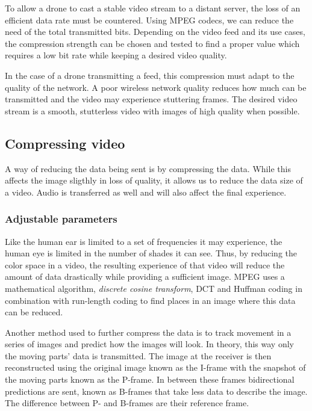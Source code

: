 To allow a drone to cast a stable video stream to a distant server, the loss of an efficient data rate must be countered. Using MPEG codecs, we can reduce the need of the total transmitted bits. Depending on the video feed and its use cases, the compression strength can be chosen and tested to find a proper value which requires a low bit rate while keeping a desired video quality.

In the case of a drone transmitting a feed, this compression must adapt to the quality of the network. A poor wireless network quality reduces how much can be transmitted and the video may experience stuttering frames. The desired video stream is a smooth, stutterless video with images of high quality when possible. 

\subsection{Compressing video}
A way of reducing the data being sent is by compressing the data. While this affects the image sligthly in loss of quality, it allows us to reduce the data size of a video. Audio is transferred as well and will also affect the final experience.

\subsubsection{Adjustable parameters}
Like the human ear is limited to a set of frequencies it may experience, the human eye is limited in the number of shades it can see. Thus, by reducing the color space in a video, the resulting experience of that video will reduce the amount of data drastically while providing a sufficient image. MPEG uses a mathematical algorithm, \textit{discrete cosine transform}, DCT and Huffman coding in combination with run-length coding to find places in an image where this data can be reduced.

Another method used to further compress the data is to track movement in a series of images and predict how the images will look. In theory, this way only the moving parts' data is transmitted. The image at the receiver is then reconstructed using the original image known as the I-frame with the snapshot of the moving parts known as the P-frame. In between these frames bidirectional predictions are sent, known as B-frames that take less data to describe the image. The difference between P- and B-frames are their reference frame.

